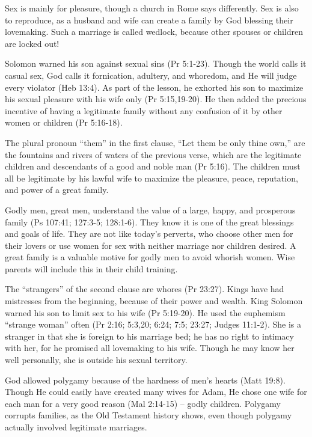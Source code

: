 Sex is mainly for pleasure, though a church in Rome says differently. Sex is also to reproduce, as a husband and wife can create a family by God blessing their lovemaking. Such a marriage is called wedlock, because other spouses or children are locked out!

Solomon warned his son against sexual sins (Pr 5:1-23). Though the world calls it casual sex, God calls it fornication, adultery, and whoredom, and He will judge every violator (Heb 13:4). As part of the lesson, he exhorted his son to maximize his sexual pleasure with his wife only (Pr 5:15,19-20). He then added the precious incentive of having a legitimate family without any confusion of it by other women or children (Pr 5:16-18).

The plural pronoun “them” in the first clause, “Let them be only thine own,” are the fountains and rivers of waters of the previous verse, which are the legitimate children and descendants of a good and noble man (Pr 5:16). The children must all be legitimate by his lawful wife to maximize the pleasure, peace, reputation, and power of a great family.

Godly men, great men, understand the value of a large, happy, and prosperous family (Ps 107:41; 127:3-5; 128:1-6). They know it is one of the great blessings and goals of life. They are not like today’s perverts, who choose other men for their lovers or use women for sex with neither marriage nor children desired. A great family is a valuable motive for godly men to avoid whorish women. Wise parents will include this in their child training.

The “strangers” of the second clause are whores (Pr 23:27). Kings have had mistresses from the beginning, because of their power and wealth. King Solomon warned his son to limit sex to his wife (Pr 5:19-20). He used the euphemism “strange woman” often (Pr 2:16; 5:3,20; 6:24; 7:5; 23:27; Judges 11:1-2). She is a stranger in that she is foreign to his marriage bed; he has no right to intimacy with her, for he promised all lovemaking to his wife. Though he may know her well personally, she is outside his sexual territory.

God allowed polygamy because of the hardness of men’s hearts (Matt 19:8). Though He could easily have created many wives for Adam, He chose one wife for each man for a very good reason (Mal 2:14-15) – godly children. Polygamy corrupts families, as the Old Testament history shows, even though polygamy actually involved legitimate marriages.

